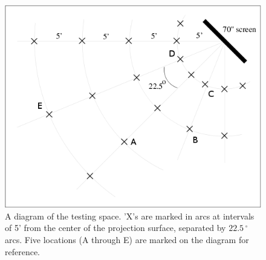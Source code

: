 \documentclass[review]{vgtc}                 %
\begin{document}
\begin{figure}
  \centering
  \includegraphics[width=0.99\linewidth]{images/room_diagram_annotated.png}
  \caption{\label{figure:laser_testing_room_diagram} A diagram of the testing space. 'X's are marked in arcs at intervals of 5' 
from the center of the projection surface, separated by $22.5\,^{\circ}$ arcs. Five locations (A through E) are marked on the diagram for reference. }
\end{figure}
\end{document}
